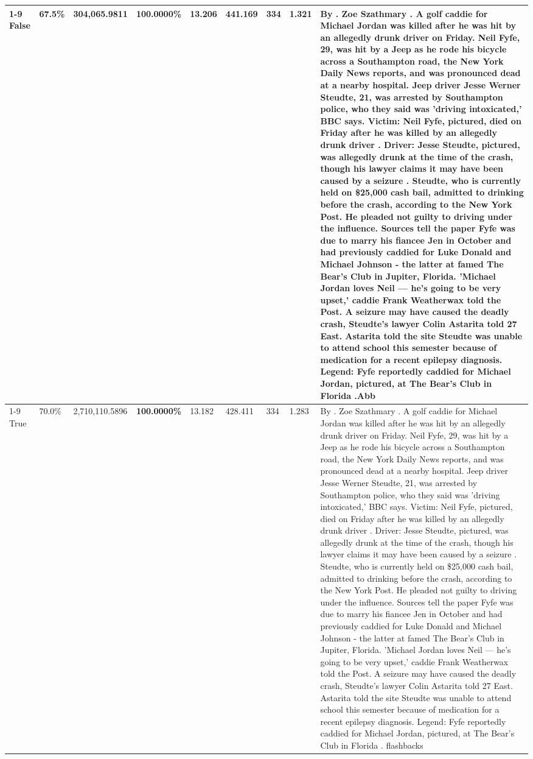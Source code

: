 \begin{table}[H]
\begin{tabular}{lllrlllll}
\cline{1-9}
False & 67.5\% & 304,065.9811 & \bfseries \color{red} 100.0000\% & 13.206 & 441.169 & 334 & 1.321 & By . Zoe Szathmary . A golf caddie for Michael Jordan was killed after he was hit by an allegedly drunk driver on Friday. Neil Fyfe, 29, was hit by a Jeep as he rode his bicycle across a Southampton road, the New York Daily News reports, and was pronounced dead at a nearby hospital. Jeep driver Jesse Werner Steudte, 21, was arrested by Southampton police, who they said was 'driving intoxicated,' BBC says. Victim: Neil Fyfe, pictured, died on Friday after he was killed by an allegedly drunk driver . Driver: Jesse Steudte, pictured, was allegedly drunk at the time of the crash, though his lawyer claims it may have been caused by a seizure . Steudte, who is currently held on \$25,000 cash bail, admitted to drinking before the crash, according to the New York Post. He pleaded not guilty to driving under the influence. Sources tell the paper Fyfe was due to marry his fiancee Jen in October and had previously caddied for Luke Donald and Michael Johnson - the latter at famed The Bear's Club in Jupiter, Florida. 'Michael Jordan loves Neil — he’s going to be very upset,' caddie Frank Weatherwax told the Post. A seizure may have caused the deadly crash, Steudte's lawyer Colin Astarita told 27 East. Astarita told the site Steudte was unable to attend school this semester because of medication for a recent epilepsy diagnosis. Legend: Fyfe reportedly caddied for Michael Jordan, pictured, at The Bear's Club in Florida .Abb \\
\cline{1-9}
True & 70.0\% & 2,710,110.5896 & \bfseries \color{red} 100.0000\% & 13.182 & 428.411 & 334 & 1.283 & By . Zoe Szathmary . A golf caddie for Michael Jordan was killed after he was hit by an allegedly drunk driver on Friday. Neil Fyfe, 29, was hit by a Jeep as he rode his bicycle across a Southampton road, the New York Daily News reports, and was pronounced dead at a nearby hospital. Jeep driver Jesse Werner Steudte, 21, was arrested by Southampton police, who they said was 'driving intoxicated,' BBC says. Victim: Neil Fyfe, pictured, died on Friday after he was killed by an allegedly drunk driver . Driver: Jesse Steudte, pictured, was allegedly drunk at the time of the crash, though his lawyer claims it may have been caused by a seizure . Steudte, who is currently held on \$25,000 cash bail, admitted to drinking before the crash, according to the New York Post. He pleaded not guilty to driving under the influence. Sources tell the paper Fyfe was due to marry his fiancee Jen in October and had previously caddied for Luke Donald and Michael Johnson - the latter at famed The Bear's Club in Jupiter, Florida. 'Michael Jordan loves Neil — he’s going to be very upset,' caddie Frank Weatherwax told the Post. A seizure may have caused the deadly crash, Steudte's lawyer Colin Astarita told 27 East. Astarita told the site Steudte was unable to attend school this semester because of medication for a recent epilepsy diagnosis. Legend: Fyfe reportedly caddied for Michael Jordan, pictured, at The Bear's Club in Florida . flashbacks \\

\end{tabular}
\end{table}
